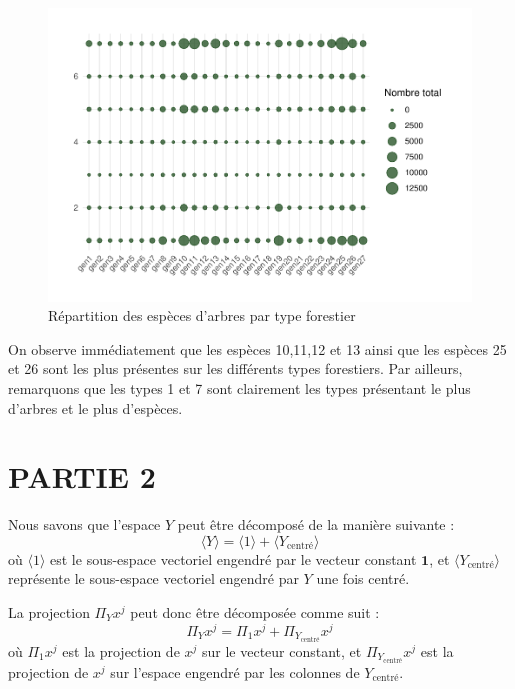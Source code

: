 \documentclass[
]{article}
\begin{document}
\begin{figure}[ht!]

{\centering \includegraphics{EL_MAZZOUJI_Wahel_GILLET_Louison_ADM_DM1_files/figure-latex/especes_forest-1} 

}

\caption{Répartition des espèces d'arbres par type forestier}\label{fig:especes_forest}
\end{figure}

On observe immédiatement que les espèces 10,11,12 et 13 ainsi que les
espèces 25 et 26 sont les plus présentes sur les différents types
forestiers. Par ailleurs, remarquons que les types 1 et 7 sont
clairement les types présentant le plus d'arbres et le plus d'espèces.

\newpage

\hypertarget{partie-2}{%
\section{PARTIE 2}\label{partie-2}}

Nous savons que l'espace \(Y\) peut être décomposé de la manière
suivante : \[
\langle Y \rangle = \langle 1 \rangle + \langle Y_{\text{centré}} \rangle
\] où \(\langle 1 \rangle\) est le sous-espace vectoriel engendré par le
vecteur constant \(\mathbf{1}\), et
\(\langle Y_{\text{centré}} \rangle\) représente le sous-espace
vectoriel engendré par \(Y\) une fois centré.

La projection \(\Pi_Y x^j\) peut donc être décomposée comme suit : \[
\Pi_Y x^j = \Pi_1 x^j + \Pi_{Y_{\text{centré}}} x^j
\] où \(\Pi_1 x^j\) est la projection de \(x^j\) sur le vecteur
constant, et \(\Pi_{Y_{\text{centré}}} x^j\) est la projection de
\(x^j\) sur l'espace engendré par les colonnes de \(Y_{\text{centré}}\).
\end{document}
